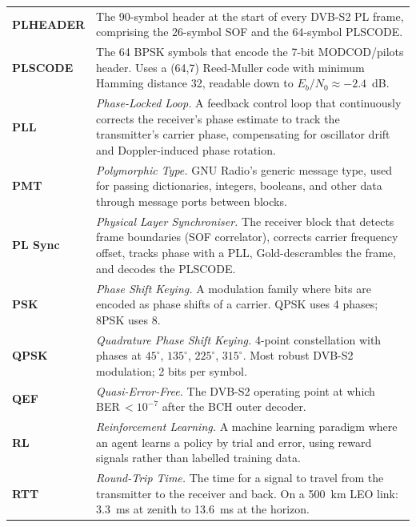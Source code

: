 \documentclass[12pt,a4paper]{report}
\begin{document}
\begin{longtable}{p{3.2cm}p{10.5cm}}
\textbf{PLHEADER} & The 90-symbol header at the start of every DVB-S2 PL frame,
    comprising the 26-symbol SOF and the 64-symbol PLSCODE. \\[4pt]

\textbf{PLSCODE} & The 64 BPSK symbols that encode the 7-bit MODCOD/pilots
    header.  Uses a (64,7) Reed-Muller code with minimum Hamming distance 32,
    readable down to $E_b/N_0 \approx -2.4$~dB. \\[4pt]

\textbf{PLL} & \textit{Phase-Locked Loop.}  A feedback control loop that
    continuously corrects the receiver's phase estimate to track the transmitter's
    carrier phase, compensating for oscillator drift and Doppler-induced phase
    rotation. \\[4pt]

\textbf{PMT} & \textit{Polymorphic Type.}  GNU Radio's generic message type,
    used for passing dictionaries, integers, booleans, and other data through
    message ports between blocks. \\[4pt]

\textbf{PL Sync} & \textit{Physical Layer Synchroniser.}  The receiver block
    that detects frame boundaries (SOF correlator), corrects carrier frequency
    offset, tracks phase with a PLL, Gold-descrambles the frame, and decodes
    the PLSCODE. \\[4pt]

\textbf{PSK} & \textit{Phase Shift Keying.}  A modulation family where bits
    are encoded as phase shifts of a carrier.  QPSK uses 4 phases; 8PSK uses 8. \\[4pt]

\textbf{QPSK} & \textit{Quadrature Phase Shift Keying.}  4-point constellation
    with phases at $45^\circ$, $135^\circ$, $225^\circ$, $315^\circ$.
    Most robust DVB-S2 modulation; 2 bits per symbol. \\[4pt]

\textbf{QEF} & \textit{Quasi-Error-Free.}  The DVB-S2 operating point at which
    BER\,$< 10^{-7}$ after the BCH outer decoder. \\[4pt]

\textbf{RL} & \textit{Reinforcement Learning.}  A machine learning paradigm
    where an agent learns a policy by trial and error, using reward signals rather
    than labelled training data. \\[4pt]

\textbf{RTT} & \textit{Round-Trip Time.}  The time for a signal to travel
    from the transmitter to the receiver and back.  On a 500~km LEO link:
    3.3~ms at zenith to 13.6~ms at the horizon. \\[4pt]


\end{longtable}
\end{document}
